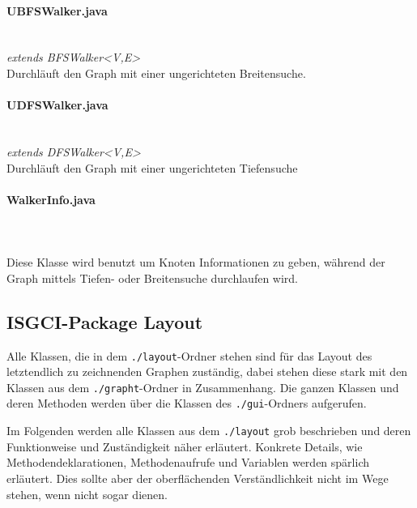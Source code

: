 \documentclass[10pt,a4paper]{article}
\begin{document}
\paragraph{UBFSWalker.java}\ \\
\emph{ extends BFSWalker<V,E>}\\
Durchläuft den Graph mit einer ungerichteten Breitensuche.\\
\paragraph{UDFSWalker.java}\ \\
\emph{extends DFSWalker<V,E>}\\
Durchläuft den Graph mit einer ungerichteten Tiefensuche\\
\paragraph{WalkerInfo.java}\ \\
\emph{}\\
Diese Klasse wird benutzt um Knoten Informationen zu geben, während der Graph mittels Tiefen- oder Breitensuche durchlaufen wird.

\subsection{ISGCI-Package Layout}

Alle Klassen, die in dem \texttt{./layout}-Ordner stehen sind für das Layout des letztendlich zu zeichnenden Graphen zuständig, dabei stehen diese stark mit den Klassen aus dem \texttt{./grapht}-Ordner in Zusammenhang. Die ganzen Klassen und deren Methoden werden über die Klassen des \texttt{./gui}-Ordners aufgerufen.

Im Folgenden werden alle Klassen aus dem \texttt{./layout} grob beschrieben und deren Funktionweise und Zuständigkeit näher erläutert. Konkrete Details, wie Methodendeklarationen, Methodenaufrufe und Variablen werden spärlich erläutert. Dies sollte aber der oberflächenden Verständlichkeit nicht im Wege stehen, wenn nicht sogar dienen.
\end{document}
